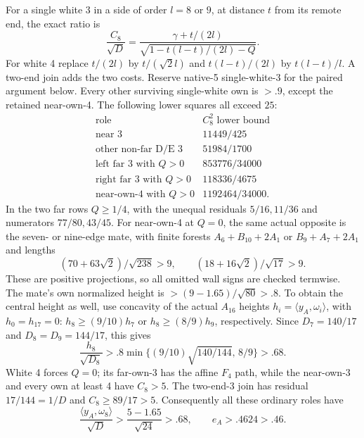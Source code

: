 \documentclass[11pt]{article}
\theoremstyle{definition}
\theoremstyle{remark}
\newcommand{\ip}[2]{\langle #1,#2\rangle}
\begin{document}
For a single white 3 in a side of order \(l=8\) or \(9\),
at distance \(t\) from its remote end, the exact ratio is
\[
 {\frac{C_8}{\sqrt D}}
 ={\frac{\gamma+t/(2l)}{
       \sqrt{1-t(l-t)/(2l)-Q}}}.
\]
For white 4 replace \(t/(2l)\) by \(t/(\sqrt2l)\) and
\(t(l-t)/(2l)\) by \(t(l-t)/l\).
A two-end join adds the two costs.
Reserve native-5 single-white-3 for the paired argument below.
Every other surviving single-white own is \(>.9\), except the
retained near-own-4.
The following lower squares all exceed \(25\):
\[
\begin{array}{c|c}
\text{role}& C_8^2\text{ lower bound}\\ \hline
\text{near 3}&11449/425\\
\text{other non-far D/E 3}&51984/1700\\
\text{left far 3 with }Q>0&853776/34000\\
\text{right far 3 with }Q>0&118336/4675\\
\text{near-own-4 with }Q>0&1192464/34000 .
\end{array}
\]
In the two far rows \(Q\ge1/4\), with the unequal residuals
\(5/16,11/36\) and numerators \(77/80,43/45\).
For near-own-4 at \(Q=0\), the same actual opposite is the
seven- or nine-edge mate, with finite forests
\(A_6+B_{10}+2A_1\) or \(B_9+A_7+2A_1\) and lengths
\[
 (70+63\sqrt2)/\sqrt{238}>9,\qquad
 (18+16\sqrt2)/\sqrt{17}>9.
\]
These are positive projections, so all omitted wall signs are
checked termwise.
The mate's own normalized height is
\(>(9-1.65)/\sqrt{80}>.8\).
To obtain the central height as well, use concavity of the actual
\(A_{16}\) heights \(h_i=\ip{y_A}{\omega_i}\), with \(h_0=h_{17}=0\):
\(h_8\ge(9/10)h_7\) or \(h_8\ge(8/9)h_9\), respectively.
Since \(D_7=140/17\) and \(D_8=D_9=144/17\), this gives
\[
 {\frac{h_8}{\sqrt{D_8}}}>
 .8\min\{(9/10)\sqrt{140/144},\,8/9\}>.68 .
\]
White 4 forces \(Q=0\); its far-own-3 has the affine \(F_4\)
path, while the near-own-3 and every own at least 4 have \(C_8>5\).
The two-end-3 join has residual \(17/144=1/D\) and
\(C_8\ge89/17>5\).
Consequently all these ordinary roles have
\[
 {\frac{\ip{y_A}{\omega_8}}{\sqrt D}}
 >{\frac{5-1.65}{\sqrt{24}}}>.68,\qquad e_A>.4624>.46.
\]
\end{document}
